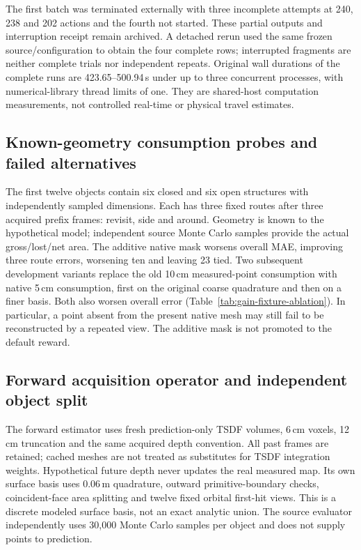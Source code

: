 The first batch was terminated externally with three incomplete attempts at 240, 238 and 202 actions and the fourth not started. These partial outputs and interruption receipt remain archived. A detached rerun used the same frozen source/configuration to obtain the four complete rows; interrupted fragments are neither complete trials nor independent repeats. Original wall durations of the complete runs are 423.65--500.94\,s under up to three concurrent processes, with numerical-library thread limits of one. They are shared-host computation measurements, not controlled real-time or physical travel estimates.

\subsection{Known-geometry consumption probes and failed alternatives}
The first twelve objects contain six closed and six open structures with independently sampled dimensions. Each has three fixed routes after three acquired prefix frames: revisit, side and around. Geometry is known to the hypothetical model; independent source Monte Carlo samples provide the actual gross/lost/net area. The additive native mask worsens overall MAE, improving three route errors, worsening ten and leaving 23 tied. Two subsequent development variants replace the old 10\,cm measured-point consumption with native 5\,cm consumption, first on the original coarse quadrature and then on a finer basis. Both also worsen overall error (Table~\ref{tab:gain-fixture-ablation}). In particular, a point absent from the present native mesh may still fail to be reconstructed by a repeated view. The additive mask is not promoted to the default reward.


\subsection{Forward acquisition operator and independent object split}
The forward estimator uses fresh prediction-only TSDF volumes, 6\,cm voxels, 12\,cm truncation and the same acquired depth convention. All past frames are retained; cached meshes are not treated as substitutes for TSDF integration weights. Hypothetical future depth never updates the real measured map. Its own surface basis uses 0.06\,m quadrature, outward primitive-boundary checks, coincident-face area splitting and twelve fixed orbital first-hit views. This is a discrete modeled surface basis, not an exact analytic union. The source evaluator independently uses 30,000 Monte Carlo samples per object and does not supply points to prediction.

